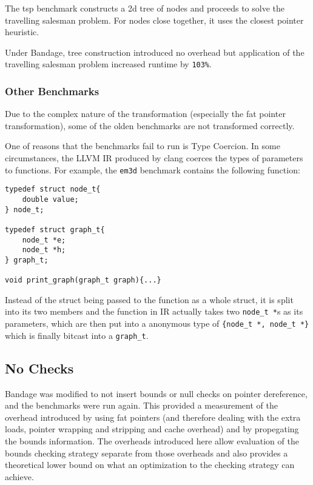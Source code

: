 The tsp benchmark constructs a 2d tree of nodes and proceeds to solve the travelling salesman problem.
For nodes close together, it uses the closest pointer heuristic.

Under Bandage, tree construction introduced no overhead but application of the travelling salesman problem increased runtime by \verb!103%!.

\subsubsection{Other Benchmarks}

Due to the complex nature of the transformation (especially the fat pointer transformation), some of the olden benchmarks are not transformed correctly.


One of reasons that the benchmarks fail to run is Type Coercion.
In some circumstances, the LLVM IR produced by clang coerces the types of parameters to functions.
For example, the \verb!em3d! benchmark contains the following function:

\begin{verbatim}
typedef struct node_t{
    double value;
} node_t;

typedef struct graph_t{
    node_t *e;
    node_t *h;
} graph_t;

void print_graph(graph_t graph){...}
\end{verbatim}

Instead of the struct being passed to the function as a whole struct, it is split into its two members and the function in IR actually takes two \verb!node_t *!s as its parameters, which are then put into a anonymous type of \verb!{node_t *, node_t *}! which is finally bitcast into a \verb!graph_t!.

\subsection{No Checks}

Bandage was modified to not insert bounds or null checks on pointer dereference, and the benchmarks were run again.
This provided a measurement of the overhead introduced by using fat pointers (and therefore dealing with the extra loads, pointer wrapping and stripping and cache overhead) and by propegating the bounds information.
The overheads introduced here allow evaluation of the bounds checking strategy separate from those overheads and also provides a theoretical lower bound on what an optimization to the checking strategy can achieve.

